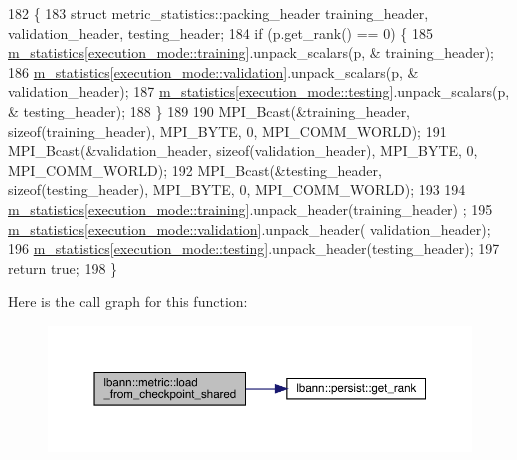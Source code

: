 \begin{DoxyCode}
182                                                    \{
183   \textcolor{keyword}{struct }metric\_statistics::packing\_header training\_header, validation\_header, testing\_header;
184   \textcolor{keywordflow}{if} (p.get\_rank() == 0) \{
185     \hyperlink{classlbann_1_1metric_a9949d8aceedbc113aa2c356046ed73fc}{m\_statistics}[\hyperlink{base_8hpp_a2781a159088df64ed7d47cc91c4dc0a8ac185ddac8b5a8f5aa23c5b80bc12d214}{execution\_mode::training}].unpack\_scalars(p, &
      training\_header);
186     \hyperlink{classlbann_1_1metric_a9949d8aceedbc113aa2c356046ed73fc}{m\_statistics}[\hyperlink{base_8hpp_a2781a159088df64ed7d47cc91c4dc0a8aa617908b172c473cb8e8cda059e55bf0}{execution\_mode::validation}].unpack\_scalars(p, &
      validation\_header);
187     \hyperlink{classlbann_1_1metric_a9949d8aceedbc113aa2c356046ed73fc}{m\_statistics}[\hyperlink{base_8hpp_a2781a159088df64ed7d47cc91c4dc0a8aae2b1fca515949e5d54fb22b8ed95575}{execution\_mode::testing}].unpack\_scalars(p, &
      testing\_header);
188   \}
189 
190   MPI\_Bcast(&training\_header, \textcolor{keyword}{sizeof}(training\_header), MPI\_BYTE, 0, MPI\_COMM\_WORLD);
191   MPI\_Bcast(&validation\_header, \textcolor{keyword}{sizeof}(validation\_header), MPI\_BYTE, 0, MPI\_COMM\_WORLD);
192   MPI\_Bcast(&testing\_header, \textcolor{keyword}{sizeof}(testing\_header), MPI\_BYTE, 0, MPI\_COMM\_WORLD);
193 
194   \hyperlink{classlbann_1_1metric_a9949d8aceedbc113aa2c356046ed73fc}{m\_statistics}[\hyperlink{base_8hpp_a2781a159088df64ed7d47cc91c4dc0a8ac185ddac8b5a8f5aa23c5b80bc12d214}{execution\_mode::training}].unpack\_header(training\_header)
      ;
195   \hyperlink{classlbann_1_1metric_a9949d8aceedbc113aa2c356046ed73fc}{m\_statistics}[\hyperlink{base_8hpp_a2781a159088df64ed7d47cc91c4dc0a8aa617908b172c473cb8e8cda059e55bf0}{execution\_mode::validation}].unpack\_header(
      validation\_header);
196   \hyperlink{classlbann_1_1metric_a9949d8aceedbc113aa2c356046ed73fc}{m\_statistics}[\hyperlink{base_8hpp_a2781a159088df64ed7d47cc91c4dc0a8aae2b1fca515949e5d54fb22b8ed95575}{execution\_mode::testing}].unpack\_header(testing\_header);
197   \textcolor{keywordflow}{return} \textcolor{keyword}{true};
198 \}
\end{DoxyCode}
Here is the call graph for this function\+:\nopagebreak
\begin{figure}[H]
\begin{center}
\leavevmode
\includegraphics[width=350pt]{classlbann_1_1metric_ab3d1ec8247352467790be036a07cfc2b_cgraph}
\end{center}
\end{figure}
\mbox{\label{classlbann_1_1metric_af455d7b6874d3491bc04f0f2ebfcab51}} 
